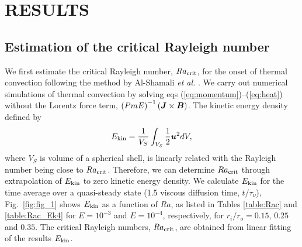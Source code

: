 \section{RESULTS}

\subsection{Estimation of the critical Rayleigh number}

%
{\color{red}
We first estimate the critical Rayleigh number, $Ra_{\rm crit}$, for the onset of thermal convection following the method by Al-Shamali {\it et al.} .
We carry out numerical simulations of thermal convection by solving eqs (\ref{eq:momentum})--(\ref{eq:heat}) without the Lorentz force term, $\left(Pm E\right)^{-1} \left(\mbox{\boldmath$J$} \times \mbox{\boldmath$B$} \right)$.
The kinetic energy density defined by
%
\begin{equation}
E_{\rm kin} = \frac{1}{V_{S}} \int_{V_{S}} \frac{1}{2} \mbox{\boldmath$u$}^{2} dV,
\label{eq:kinetic_energy}
\end{equation}
%
where $V_{S}$ is volume of a spherical shell, is linearly related with the Rayleigh number being close to $Ra_{\rm crit}$.
Therefore, we can determine $Ra_{\rm crit}$ through extrapolation of $E_{\rm kin}$ to zero kinetic energy density.
We calculate $E_{\rm kin}$ for the time average over a quasi-steady state (1.5 viscous diffusion time, $t/\tau_\nu$),
}
{\color{red}
Fig.~\ref{fig:fig_1} shows $E_{\rm kin}$ as a function of $Ra$, as listed in Tables \ref{table:Rac} and \ref{table:Rac_Ek4} for $E = 10^{-3}$ and $E = 10^{-4}$, respectively, for $r_i / r_o = 0.15$, $0.25$ and $0.35$.
The critical Rayleigh numbers, $Ra_{\rm crit}$, are obtained from linear fitting of the results $E_{\rm kin}$.
}


